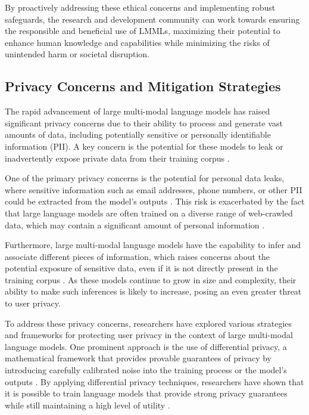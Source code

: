 \documentclass[11pt]{article}
\begin{document}
By proactively addressing these ethical concerns and implementing robust safeguards, the research and development community can work towards ensuring the responsible and beneficial use of LMMLs, maximizing their potential to enhance human knowledge and capabilities while minimizing the risks of unintended harm or societal disruption.

\subsection{Privacy Concerns and Mitigation Strategies}

The rapid advancement of large multi-modal language models has raised significant privacy concerns due to their ability to process and generate vast amounts of data, including potentially sensitive or personally identifiable information (PII). A key concern is the potential for these models to leak or inadvertently expose private data from their training corpus \cite{ref236,ref237}.

One of the primary privacy concerns is the potential for personal data leaks, where sensitive information such as email addresses, phone numbers, or other PII could be extracted from the model's outputs \cite{ref238,ref236}. This risk is exacerbated by the fact that large language models are often trained on a diverse range of web-crawled data, which may contain a significant amount of personal information \cite{ref239,ref240}.

Furthermore, large multi-modal language models have the capability to infer and associate different pieces of information, which raises concerns about the potential exposure of sensitive data, even if it is not directly present in the training corpus \cite{ref237}. As these models continue to grow in size and complexity, their ability to make such inferences is likely to increase, posing an even greater threat to user privacy.

To address these privacy concerns, researchers have explored various strategies and frameworks for protecting user privacy in the context of large multi-modal language models. One prominent approach is the use of differential privacy, a mathematical framework that provides provable guarantees of privacy by introducing carefully calibrated noise into the training process or the model's outputs \cite{ref241,ref242}. By applying differential privacy techniques, researchers have shown that it is possible to train language models that provide strong privacy guarantees while still maintaining a high level of utility \cite{ref243,ref244}.
\end{document}
